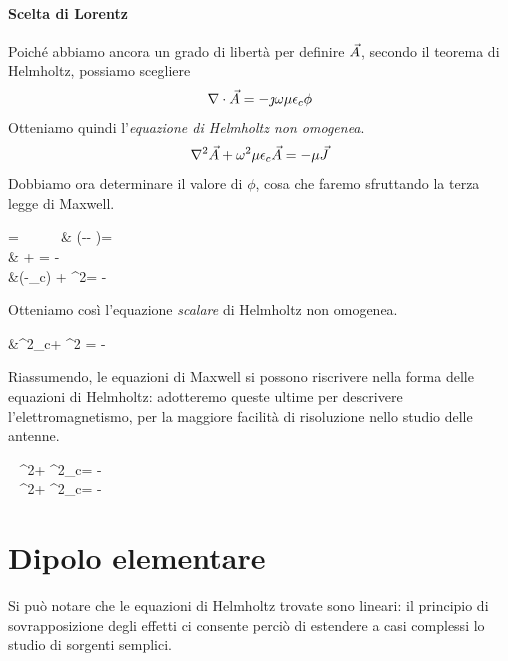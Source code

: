\paragraph{Scelta di Lorentz}
Poiché abbiamo ancora un grado di libertà per definire $\vec{A}$, secondo il teorema di Helmholtz, possiamo scegliere
\begin{equation}
	\nabla\cdot \vec{A} = -\jmath \omega \mu \epsilon_c \phi
\end{equation}
Otteniamo quindi l'\emph{equazione di Helmholtz non omogenea}.
\begin{equation}
	\nabla^2\vec{A} + \omega^2 \mu\epsilon_c\vec{A} =-\mu \vec{J}
\end{equation}
Dobbiamo ora determinare il valore di $\phi$, cosa che faremo sfruttando la terza legge di Maxwell.
\begin{esp*}
	\diverg\E
		= \frac{\rho}{\epsilon} ~~ \implies ~~ &
		\diverg\left(-\jmath \omega \A - \nabla \phi	 \right)= \frac{\rho}{\epsilon}\\
	 & \jmath \omega \A + \nabla \phi= -\frac{\rho}{\epsilon}	 \\
	&\jmath\omega\left(-\jmath \omega\mu\epsilon_c\phi\right) + \nabla^2\phi = - \frac{\rho}{\epsilon}\\
\end{esp*}

Otteniamo così l'equazione \emph{scalare} di Helmholtz non omogenea.
\begin{esp*}
	&\omega^2\mu\epsilon_c\phi + \nabla^2 \phi = -\frac{\rho}{\epsilon}
\end{esp*}

Riassumendo, le equazioni di Maxwell si possono riscrivere nella forma delle equazioni di Helmholtz: adotteremo queste ultime per descrivere l'elettromagnetismo, per la maggiore facilità di risoluzione nello studio delle antenne.

\begin{esp}\label{eq:helmolts-lorentz}
	\begin{dcases}
		~ \nabla^2\A + \omega^2\mu\epsilon_c\A = -\mu\J \\
		~ \nabla^2\phi + \omega^2\mu\epsilon_c\phi = -\frac{\rho}{\epsilon}
	\end{dcases}
\end{esp}

\section{Dipolo elementare}
Si può notare che le equazioni di Helmholtz trovate sono lineari: il principio di sovrapposizione degli effetti ci consente perciò di estendere a casi complessi lo studio di sorgenti semplici.

